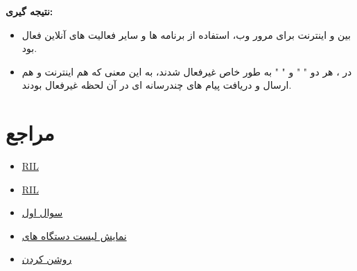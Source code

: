 \documentclass{report}
\begin{document}
\textbf{نتیجه گیری:}
\begin{itemize}
	\item 
	بین
	و
	اینترنت برای مرور وب، استفاده از برنامه ها و سایر فعالیت های آنلاین فعال بود.
	\item 
	در 
	،
	 هر دو
	 "
	 " و "
	 " به طور خاص غیرفعال شدند، به این معنی که هم اینترنت و هم ارسال و دریافت پیام های چندرسانه ای در آن لحظه غیرفعال بودند.
\end{itemize}

\section* {مراجع}
\begin{itemize}
	\item 
	\href{https://www.oreilly.com/library/view/android-hackers-handbook/9781118608647/9781118922255c11.xhtml} {RIL}
	\item 
	\href{https://en.wikipedia.org/wiki/Radio_Interface_Layer} {RIL}
	
	\item 
	\href{https://en.wikipedia.org/wiki/Radio_Interface_Layer} {سوال اول}
	
	\item 
	\href{https://stackoverflow.com/questions/21170392/my-android-device-does-not-appear-in-the-list-of-adb-devices} {نمایش لیست دستگاه های 
	}
	
	\item 
	\href{https://en-gb.support.motorola.com/app/answers/detail/a_id/159678/~/developer-options} {روشن کردن 
	}
	
\end{itemize}
\end{document}
